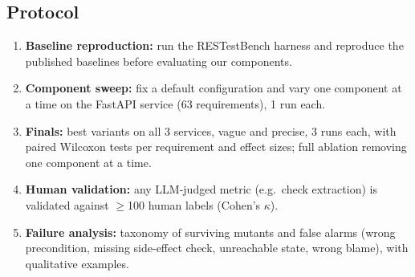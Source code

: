 \documentclass[11pt,a4paper]{article}
\begin{document}
\subsection{Protocol}
\begin{enumerate}
  \item \textbf{Baseline reproduction:} run the RESTestBench harness and reproduce the published baselines before evaluating our components.
  \item \textbf{Component sweep:} fix a default configuration and vary one component at a time on the FastAPI service (63 requirements), 1 run each.
  \item \textbf{Finals:} best variants on all 3 services, vague and precise, 3 runs each, with paired Wilcoxon tests per requirement and effect sizes; full ablation removing one component at a time.
  \item \textbf{Human validation:} any LLM-judged metric (e.g.\ check extraction) is validated against $\geq$100 human labels (Cohen's $\kappa$).
  \item \textbf{Failure analysis:} taxonomy of surviving mutants and false alarms (wrong precondition, missing side-effect check, unreachable state, wrong blame), with qualitative examples.
\end{enumerate}

\end{document}
